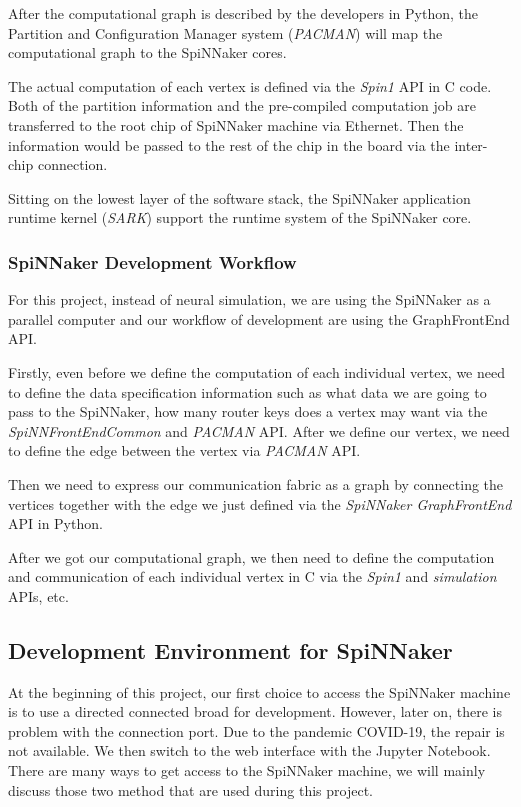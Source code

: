 After the computational graph is described by the developers in Python, the Partition and Configuration Manager system (\textit{PACMAN}) will map the computational graph to the SpiNNaker cores. 

The actual computation of each vertex is defined via the \textit{Spin1} API in C code. Both of the partition information and the pre-compiled computation job are transferred to the root chip of SpiNNaker machine via Ethernet. Then the information would be passed to the rest of the chip in the board via  the inter-chip connection.


Sitting on the lowest layer of the software stack, the SpiNNaker application runtime kernel (\textit{SARK}) support the runtime system of the SpiNNaker core. 


\subsubsection{SpiNNaker Development Workflow} \label{sec:sdw}

For this project, instead of neural simulation, we are using the SpiNNaker as a parallel computer and our workflow of development are using the GraphFrontEnd API.

Firstly, even before we define the computation of each individual vertex, we need to define the data specification information such as what data we are going to pass to the SpiNNaker, how many router keys does a vertex may want via the \textit{SpiNNFrontEndCommon} and \textit{PACMAN} API. After we define our vertex, we need to define the edge between the vertex via \textit{PACMAN} API.

Then we need to express our communication fabric as a graph by connecting the vertices together with the edge we just defined via the \textit{SpiNNaker GraphFrontEnd} API in Python. 

After we got our computational graph, we then need to define the computation and communication of each individual vertex in C via the \textit{Spin1} and \textit{simulation} APIs, etc.

\subsection{Development Environment for SpiNNaker} \label{sec:impl}
At the beginning of this project, our first choice to access the SpiNNaker machine is to use a directed connected broad for development. However, later on, there is problem with the connection port. Due to the pandemic COVID-19, the repair is not available. We then switch to the web interface with the Jupyter Notebook. There are many ways to get access to the SpiNNaker machine, we will mainly discuss those two method that are used during this project.
